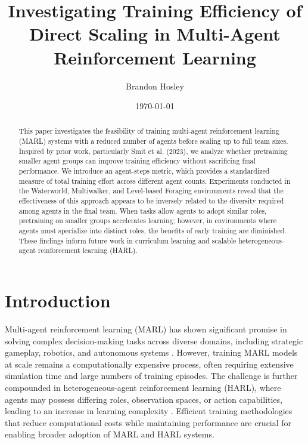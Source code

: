 \documentclass{article}
\title{Investigating Training Efficiency of Direct Scaling in Multi-Agent Reinforcement Learning}
\author{Brandon Hosley}
\date{\today}
\begin{document}
\maketitle

\begin{abstract}
    This paper investigates the feasibility of training multi-agent reinforcement learning (MARL) 
    systems with a reduced number of agents before scaling up to full team sizes. 
    Inspired by prior work, particularly Smit et al. (2023), 
    we analyze whether pretraining smaller agent groups can improve training efficiency 
    without sacrificing final performance. 
    We introduce an agent-steps metric, which provides a standardized measure of 
    total training effort across different agent counts.
    Experiments conducted in the Waterworld, Multiwalker, and Level-based Foraging environments 
    reveal that the effectiveness of this approach appears to be inversely related 
    to the diversity required among agents in the final team. 
    When tasks allow agents to adopt similar roles, 
    pretraining on smaller groups accelerates learning; 
    however, in environments where agents must specialize into distinct roles, 
    the benefits of early training are diminished. 
    These findings inform future work in curriculum learning and scalable 
    heterogeneous-agent reinforcement learning (HARL).
\end{abstract}

\section{Introduction}

Multi-agent reinforcement learning (MARL) has shown significant promise in solving complex 
decision-making tasks across diverse domains, including strategic gameplay, robotics, 
and autonomous systems \cite{silver2016, vinyals2019, berner2019}. 
However, training MARL models at scale remains a computationally expensive process, 
often requiring extensive simulation time and large numbers of training episodes. 
The challenge is further compounded in heterogeneous-agent reinforcement learning (HARL), 
where agents may possess differing roles, observation spaces, or action capabilities, 
leading to an increase in learning complexity \cite{rizk2019, yang2021a}.
Efficient training methodologies that reduce computational costs while maintaining 
performance are crucial for enabling broader adoption of MARL and HARL systems.
\end{document}
